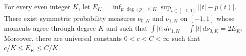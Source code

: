 For every even integer \(K\), let \(E_K=\inf_{p:\deg(p)\leq K}\sup_{t\in[-1,1]}\lvert\lvert t\rvert-p(t)\rvert\).  There exist symmetric probability measures \(\nu_{0,K}\) and \(\nu_{1,K}\) on \([-1,1]\) whose moments agree through degree \(K\) and such that \(\int\lvert t\rvert\,d\nu_{1,K}-\int\lvert t\rvert\,d\nu_{0,K}=2E_K\).  Moreover, there are universal constants \(0<c<C<\infty\) such that \(c/K\leq E_K\leq C/K\).